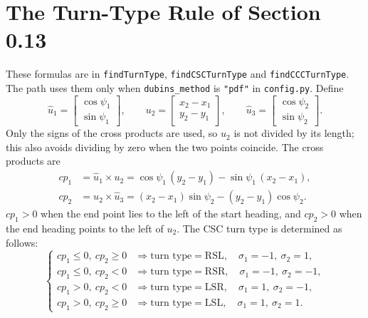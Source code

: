 \documentclass[10pt]{article}
\newcommand{\code}[1]{\texttt{#1}}
\newcommand{\TT}[1]{\mathrm{#1}}
\begin{document}
\section{The Turn-Type Rule of Section 0.13}
\label{sec:rule}

These formulas are in \code{findTurnType}, \code{findCSCTurnType} and \code{findCCCTurnType}. The path uses them
only when \code{dubins\_method} is \code{"pdf"} in \code{config.py}. Define
\begin{equation}
  \hat{u}_1 = \begin{bmatrix} \cos\psi_1 \\ \sin\psi_1 \end{bmatrix}, \qquad
  u_2 = \begin{bmatrix} x_2 - x_1 \\ y_2 - y_1 \end{bmatrix}, \qquad
  \hat{u}_3 = \begin{bmatrix} \cos\psi_2 \\ \sin\psi_2 \end{bmatrix}.
  \label{eq:rule-vectors}
\end{equation}
Only the signs of the cross products are used, so $u_2$ is not divided by its length; this also avoids dividing by
zero when the two points coincide. The cross products are
\begin{equation}
  \begin{aligned}
  cp_1 &= \hat{u}_1 \times u_2 = \cos\psi_1\,(y_2 - y_1) - \sin\psi_1\,(x_2 - x_1),\\
  cp_2 &= u_2 \times \hat{u}_3 = (x_2 - x_1)\sin\psi_2 - (y_2 - y_1)\cos\psi_2 .
  \end{aligned}
  \label{eq:cp}
\end{equation}
$cp_1 > 0$ when the end point lies to the left of the start heading, and $cp_2 > 0$ when the end heading points to
the left of $u_2$. The CSC turn type is determined as follows:
\begin{equation}
  \begin{cases}
    cp_1 \le 0,\ cp_2 \ge 0 & \Rightarrow \text{turn type} = \TT{RSL}, \quad \sigma_1 = -1,\ \sigma_2 = 1,\\
    cp_1 \le 0,\ cp_2 < 0   & \Rightarrow \text{turn type} = \TT{RSR}, \quad \sigma_1 = -1,\ \sigma_2 = -1,\\
    cp_1 > 0,\  cp_2 < 0    & \Rightarrow \text{turn type} = \TT{LSR}, \quad \sigma_1 = 1,\ \sigma_2 = -1,\\
    cp_1 > 0,\  cp_2 \ge 0  & \Rightarrow \text{turn type} = \TT{LSL}, \quad \sigma_1 = 1,\ \sigma_2 = 1.
  \end{cases}
  \label{eq:rule}
\end{equation}
\end{document}
